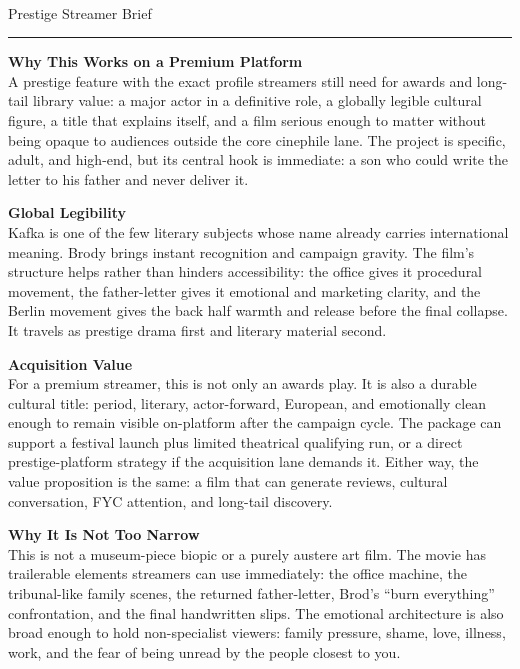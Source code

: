 \documentclass[11pt,letterpaper]{article}
\begin{document}
\begin{center}
{\Large\bfseries\sffamily \filmtitleupper}\\[3pt]
{\normalsize\sffamily\color{kafkagray} Prestige Streamer Brief}
\end{center}
\vspace{2pt}
\textcolor{sectionrule}{\rule{\textwidth}{0.5pt}}
\vspace{4pt}

\textbf{Why This Works on a Premium Platform}\\
A prestige feature with the exact profile streamers still need for awards and long-tail library value: a major actor in a definitive role, a globally legible cultural figure, a title that explains itself, and a film serious enough to matter without being opaque to audiences outside the core cinephile lane. The project is specific, adult, and high-end, but its central hook is immediate: a son who could write the letter to his father and never deliver it.

\vspace{2pt}

\textbf{Global Legibility}\\
Kafka is one of the few literary subjects whose name already carries international meaning. Brody brings instant recognition and campaign gravity. The film's structure helps rather than hinders accessibility: the office gives it procedural movement, the father-letter gives it emotional and marketing clarity, and the Berlin movement gives the back half warmth and release before the final collapse. It travels as prestige drama first and literary material second.

\vspace{2pt}

\textbf{Acquisition Value}\\
For a premium streamer, this is not only an awards play. It is also a durable cultural title: period, literary, actor-forward, European, and emotionally clean enough to remain visible on-platform after the campaign cycle. The package can support a festival launch plus limited theatrical qualifying run, or a direct prestige-platform strategy if the acquisition lane demands it. Either way, the value proposition is the same: a film that can generate reviews, cultural conversation, FYC attention, and long-tail discovery.

\vspace{2pt}

\textbf{Why It Is Not Too Narrow}\\
This is not a museum-piece biopic or a purely austere art film. The movie has trailerable elements streamers can use immediately: the office machine, the tribunal-like family scenes, the returned father-letter, Brod's ``burn everything'' confrontation, and the final handwritten slips. The emotional architecture is also broad enough to hold non-specialist viewers: family pressure, shame, love, illness, work, and the fear of being unread by the people closest to you.
\end{document}
